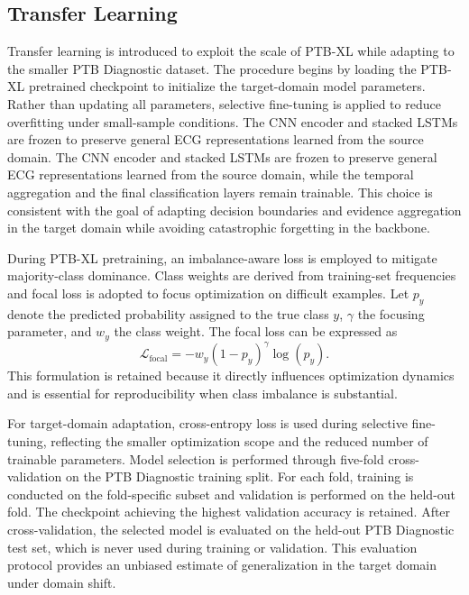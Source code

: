 \documentclass[preprint,12pt]{elsarticle}
\begin{document}
\subsection{Transfer Learning }
Transfer learning is introduced to exploit the scale of PTB-XL while adapting to the smaller PTB Diagnostic dataset. The procedure begins by loading the PTB-XL pretrained checkpoint to initialize the target-domain model parameters. Rather than updating all parameters, selective fine-tuning is applied to reduce overfitting under small-sample conditions. The CNN encoder and stacked LSTMs are frozen to preserve general ECG representations learned from the source domain. The CNN encoder and stacked LSTMs are frozen to preserve general ECG representations learned from the source domain, while the temporal aggregation and the final classification layers remain trainable. This choice is consistent with the goal of adapting decision boundaries and evidence aggregation in the target domain while avoiding catastrophic forgetting in the backbone.

During PTB-XL pretraining, an imbalance-aware loss is employed to mitigate majority-class dominance. Class weights are derived from training-set frequencies and focal loss is adopted to focus optimization on difficult examples. Let $p_y$ denote the predicted probability assigned to the true class $y$, $\gamma$ the focusing parameter, and $w_y$ the class weight. The focal loss can be expressed as
\begin{equation}
\mathcal{L}_{\mathrm{focal}} = - w_{y} (1-p_{y})^{\gamma}\log(p_{y}).
\label{eq:focal}
\end{equation}
This formulation is retained because it directly influences optimization dynamics and is essential for reproducibility when class imbalance is substantial.

For target-domain adaptation, cross-entropy loss is used during selective fine-tuning, reflecting the smaller optimization scope and the reduced number of trainable parameters. Model selection is performed through five-fold cross-validation on the PTB Diagnostic training split. For each fold, training is conducted on the fold-specific subset and validation is performed on the held-out fold. The checkpoint achieving the highest validation accuracy is retained. After cross-validation, the selected model is evaluated on the held-out PTB Diagnostic test set, which is never used during training or validation. This evaluation protocol provides an unbiased estimate of generalization in the target domain under domain shift.
\end{document}
